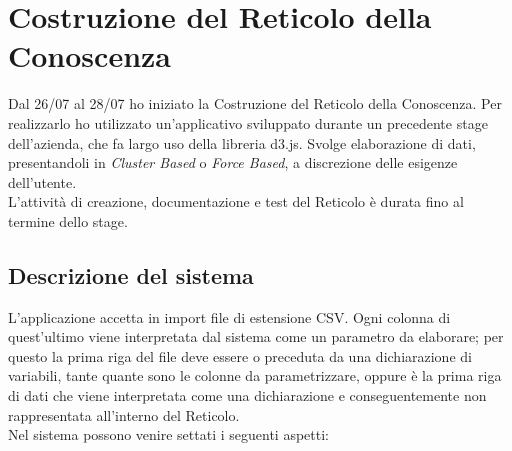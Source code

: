 \section{Costruzione del Reticolo della Conoscenza}
\label{Costruzione del Reticolo della Conoscenza}
Dal 26/07 al 28/07 ho iniziato la Costruzione del Reticolo della Conoscenza. Per realizzarlo ho utilizzato un'applicativo sviluppato durante un precedente stage dell'azienda, che fa largo uso della libreria d3.js. Svolge elaborazione di dati, presentandoli in \textit{Cluster Based} o \textit{Force Based}, a discrezione delle esigenze dell'utente.\\
L'attivit\`a di creazione, documentazione e test del Reticolo \`e durata fino al termine dello stage.

\subsection{Descrizione del sistema}
\label{Descrizione del sistema}
L'applicazione accetta in import file di estensione CSV. Ogni colonna di quest'ultimo viene interpretata dal sistema come un parametro da elaborare; per questo la prima riga del file deve essere o preceduta da una dichiarazione di variabili, tante quante sono le colonne da parametrizzare, oppure \`e la prima riga di dati che viene interpretata come una dichiarazione e conseguentemente non rappresentata all'interno del Reticolo.\\
Nel sistema possono venire settati i seguenti aspetti:
